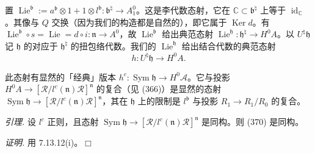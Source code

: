 置 $\operatorname{Lie}^{\mathfrak{b}}:=a^{\mathfrak{b}}\otimes1+1\otimes l^{\mathfrak{b}}:\mathfrak{b}^{\natural}\to A^{0}_1$。这是李代数态射，它在 $\mathbb{C}\subset\mathfrak{b}^{\natural}$ 上等于 $\operatorname{id}_{\mathbb{C}}$。其像与 $Q$ 交换（因为我们的构造都是自然的），即它属于 $\operatorname{Ker}d$。有 $\operatorname{Lie}^{\mathfrak{b}}\circ s=\operatorname{Lie}=d\circ i:\mathfrak{n}\to A^{0}$，故 $\operatorname{Lie}^{\mathfrak{b}}$ 给出典范态射 $\operatorname{Lie}^{\mathfrak{h}}:\mathfrak{h}^{\natural}\to H^{0}A$。以 $U^{\natural}\mathfrak{h}$ 记 $\mathfrak{h}$ 的对应于 $\mathfrak{h}^{\natural}$ 的扭包络代数。我们的 $\operatorname{Lie}^{\mathfrak{h}}$ 给出结合代数的典范态射%
\begin{equation}\tag{370}
h:U^{\natural}\mathfrak{h}\to H^{0}A.
\end{equation}

此态射有显然的「经典」版本 $h^{c}:\operatorname{Sym}\mathfrak{h}\to H^{0}\mathcal{A}$。它与投影 $H^{0}A\to[\mathcal{R}/l^{c}(\mathfrak{n})\mathcal{R}]^{\mathfrak{n}}$ 的复合（见 (366)）是显然的态射 $\operatorname{Sym}\mathfrak{h}\to[\mathcal{R}/l^{c}(\mathfrak{n})\mathcal{R}]^{\mathfrak{n}}$，其在 $\mathfrak{h}$ 上的限制是 $l^{\mathfrak{b}}$ 与投影 $R_1\to R_1/R_0$ 的复合。

 \emph{引理.} 设 $l^{c}$ 正则，且态射 $\operatorname{Sym}\mathfrak{h}\to[\mathcal{R}/l^{c}(\mathfrak{n})\mathcal{R}]^{\mathfrak{n}}$ 是同构。则 (370) 是同构。

\emph{证明.} 用 7.13.12(i)。\hfill$\Box$

